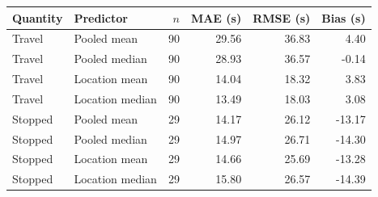 \begin{tabular}{llrrrr}
\toprule
Quantity & Predictor & $n$ & MAE (s) & RMSE (s) & Bias (s)\\
\midrule
Travel & Pooled mean & 90 & 29.56 & 36.83 & 4.40\\
Travel & Pooled median & 90 & 28.93 & 36.57 & -0.14\\
Travel & Location mean & 90 & 14.04 & 18.32 & 3.83\\
Travel & Location median & 90 & 13.49 & 18.03 & 3.08\\
\midrule
Stopped & Pooled mean & 29 & 14.17 & 26.12 & -13.17\\
Stopped & Pooled median & 29 & 14.97 & 26.71 & -14.30\\
Stopped & Location mean & 29 & 14.66 & 25.69 & -13.28\\
Stopped & Location median & 29 & 15.80 & 26.57 & -14.39\\
\bottomrule
\end{tabular}
